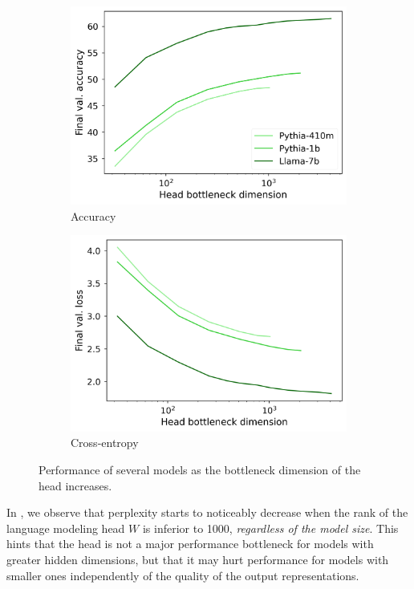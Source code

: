 \begin{figure}[h]
\centering
    \begin{subfigure}{0.41\columnwidth}
         \includegraphics[width=\linewidth]{sources/part_1/softmax_bottleneck/imgs/llama_bottleneck_acc.png}
         \caption{Accuracy}
         \label{fig:bottleneck_acc}
    \end{subfigure}
    \begin{subfigure}{0.42\columnwidth}
         \includegraphics[width=\linewidth]{sources/part_1/softmax_bottleneck/imgs/llama_bottleneck_loss.png}
         \caption{Cross-entropy}
         \label{fig:bottleneck_ce}
    \end{subfigure}
    \caption{Performance of several models as the bottleneck dimension of the head increases.}
    \label{fig:perf_bottleneck}
\end{figure}
In , we observe that perplexity starts to noticeably decrease when the rank of the language modeling head $W$ is inferior to 1000, \textit{regardless of the model size}. This hints that the head is not a major performance bottleneck for models with greater hidden dimensions, but that it may hurt performance for models with smaller ones independently of the quality of the output representations.

